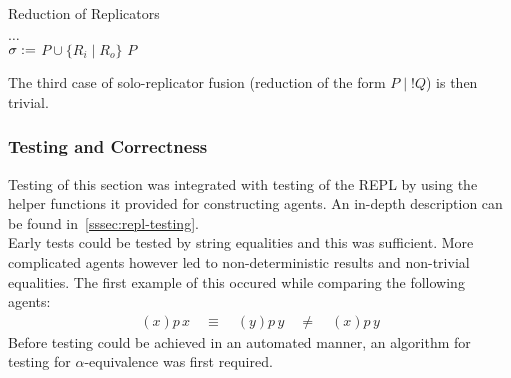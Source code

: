         \begin{breakablealgorithm}
            \caption{Reduction of Replicators}
            \begin{algorithmic}[1]
                        \State$\ldots$
                    \EndFor\\

                                \State$\sigma :=$ 
                                    \State\Return$P \cup \{R_i \; | \; R_o\}$
                                \EndIf
                            \EndIf
                        \EndFor
                    \EndFor
                    \State\Return$P$
                \EndFunction
            \end{algorithmic}
        \end{breakablealgorithm}

        The third case of solo-replicator fusion (reduction of the form $P \;|\; !Q$) is then trivial.


    \subsubsection{Testing and Correctness}
        Testing of this section was integrated with testing of the REPL by using the helper functions it provided for constructing agents.
        An in-depth description can be found in~\ref{sssec:repl-testing}. \\
        
        Early tests could be tested by string equalities and this was sufficient.
        More complicated agents however led to non-deterministic results and non-trivial equalities.
        The first example of this occured while comparing the following agents:
        \begin{align*}
            (x) p \, x \quad\equiv\quad (y) p \, y \quad\neq\quad (x) p \, y
        \end{align*}
        Before testing could be achieved in an automated manner, an algorithm for testing for $\alpha$-equivalence was first required.\\

